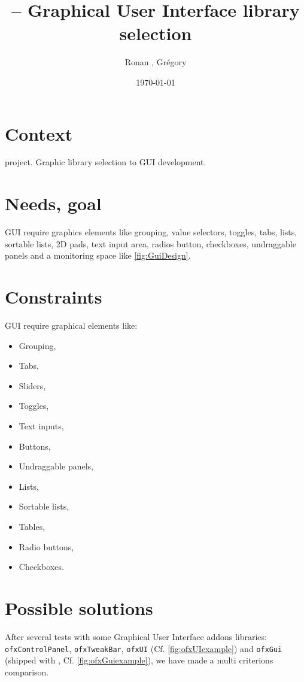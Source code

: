 \documentclass[a4paper,titlepage,oneside]{article}
\author{Ronan \bsc{Legardinier}, Grégory \bsc{David}}
\title{\vilain{} -- Graphical User Interface library selection}
\date{\today{}}
\begin{document}
\maketitle{}
\tableofcontents{}
\newpage

\section{Context}
\vilain{} project. Graphic library selection to GUI development.

\section{Needs, goal}
\vilain{} GUI require graphics elements like grouping, value selectors, toggles, tabs, lists, sortable lists, 2D pads, text input area, radios button, checkboxes, undraggable panels and a monitoring space like \figurename
\ref{fig:GuiDesign}.


\newpage
\section{Constraints}
\vilain{} GUI require graphical elements like:
\begin{itemize}
    \item Grouping,
    \item Tabs,
    \item Sliders,
    \item Toggles,
    \item Text inputs,
    \item Buttons,
    \item Undraggable panels,
    \item Lists,
    \item Sortable lists,
    \item Tables,
    \item Radio buttons,
    \item Checkboxes.
\end{itemize}

\newpage
\section{Possible solutions}
After several tests with some \OF{} Graphical User Interface addons libraries: \texttt{ofxControlPanel}, \texttt{ofxTweakBar}, \texttt{ofxUI} (Cf. \figurename \ref{fig:ofxUIexample}) and \texttt{ofxGui} (shipped with \OF{}, Cf. \figurename \ref{fig:ofxGuiexample}), we have made a multi criterions comparison.
\end{document}
